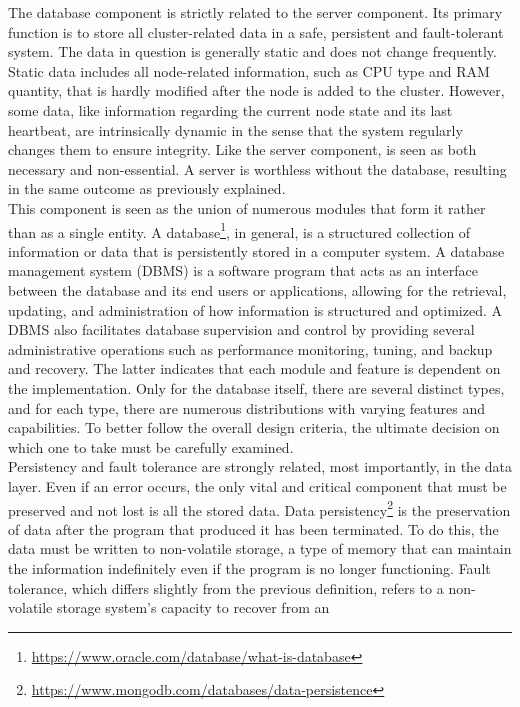 The database component is strictly related to the server component. Its primary
function is to store all cluster-related data in a safe, persistent and fault-tolerant
system. The data in question is generally static and does not change frequently.
Static data includes all node-related information, such as CPU type and RAM
quantity, that is hardly modified after the node is added to the cluster.
However, some data, like information regarding the current node state and its
last heartbeat, are intrinsically dynamic in the sense that the system regularly
changes them to ensure integrity. Like the server component, is seen as both necessary
and non-essential. A server is worthless without the database, resulting in the same
outcome as previously explained. \\ %
This component is seen as the union of numerous modules that form it rather than
as a single entity. A database\footnote{\url{https://www.oracle.com/database/what-is-database}},
in general, is a structured collection of information or data that is
persistently stored in a computer system. A database management system (DBMS) is
a software program that acts as an interface between the database and its end users
or applications, allowing for the retrieval, updating, and administration of how
information is structured and optimized. A DBMS also facilitates database supervision
and control by providing several administrative operations such as performance monitoring,
tuning, and backup and recovery. The latter indicates that each module and
feature is dependent on the implementation. Only for the database itself, there
are several distinct types, and for each type, there are numerous distributions
with varying features and capabilities. To better follow the overall design criteria,
the ultimate decision on which one to take must be carefully examined. \\ %
Persistency and fault tolerance are strongly related, most importantly, in the
data layer. Even if an error occurs, the only vital and critical component that
must be preserved and not lost is all the stored data. Data persistency\footnote{\url{https://www.mongodb.com/databases/data-persistence}}
is the preservation of data after the program that produced it has been terminated.
To do this, the data must be written to non-volatile storage, a type of memory
that can maintain the information indefinitely even if the program is no longer
functioning. Fault tolerance, which differs slightly from the previous
definition, refers to a non-volatile storage system's capacity to recover from an
